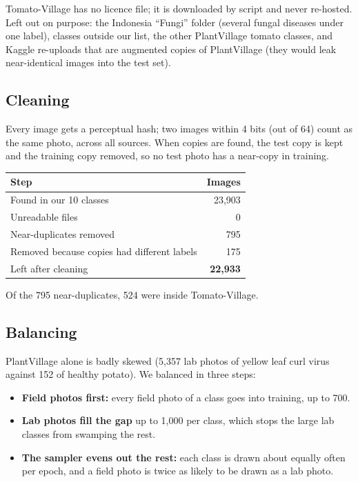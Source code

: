 \documentclass[11pt,a4paper]{article}
\newcommand{\hdr}[1]{\textbf{#1}}
\begin{document}
Tomato-Village has no licence file; it is downloaded by script and never
re-hosted. Left out on purpose: the Indonesia ``Fungi'' folder (several fungal
diseases under one label), classes outside our list, the other PlantVillage
tomato classes, and Kaggle re-uploads that are augmented copies of PlantVillage
(they would leak near-identical images into the test set).

\subsection{Cleaning}

Every image gets a perceptual hash; two images within 4 bits (out of 64) count as
the same photo, across all sources. When copies are found, the test copy is kept
and the training copy removed, so no test photo has a near-copy in training.

\begin{table}[H]
\centering
\begin{tabular}{@{}lr@{}}
\toprule
\hdr{Step} & \hdr{Images} \\
\midrule
Found in our 10 classes & 23,903 \\
Unreadable files & 0 \\
Near-duplicates removed & 795 \\
Removed because copies had different labels & 175 \\
\midrule
Left after cleaning & \textbf{22,933} \\
\bottomrule
\end{tabular}
\end{table}

Of the 795 near-duplicates, 524 were inside Tomato-Village.

\subsection{Balancing}

PlantVillage alone is badly skewed (5,357 lab photos of yellow leaf curl virus
against 152 of healthy potato). We balanced in three steps:

\begin{itemize}
  \item \textbf{Field photos first:} every field photo of a class goes into
        training, up to 700.
  \item \textbf{Lab photos fill the gap} up to 1,000 per class, which stops the
        large lab classes from swamping the rest.
  \item \textbf{The sampler evens out the rest:} each class is drawn about equally
        often per epoch, and a field photo is twice as likely to be drawn as a lab photo.
\end{itemize}
\end{document}
